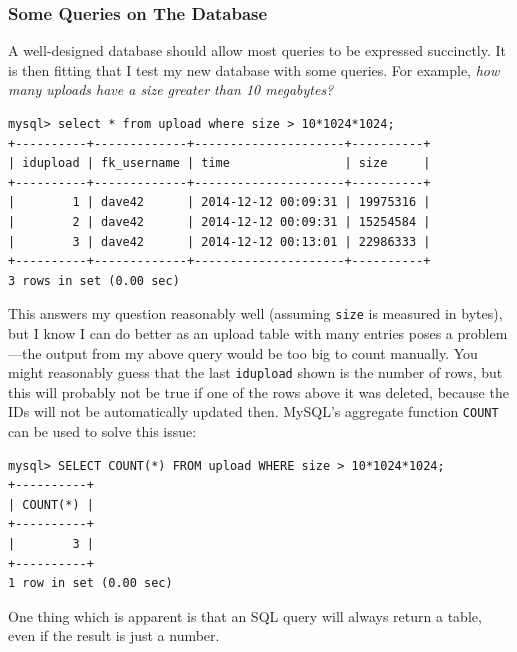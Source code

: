\documentclass[11pt,a4paper]{report}
\begin{document}
	\subsubsection{Some Queries on The Database}
	A well-designed database should allow most queries to be expressed succinctly. It is then fitting that I test my new database with some queries. For example, \textit{how many uploads have a size greater than 10 megabytes?}
	\begin{lstlisting}[style=highlightable, frame=none, numbers=none, xleftmargin=0ex, xrightmargin=0ex]
mysql> select * from upload where size > 10*1024*1024;
+----------+-------------+---------------------+----------+
| idupload | fk_username | time                | size     |
+----------+-------------+---------------------+----------+
|        1 | dave42      | 2014-12-12 00:09:31 | 19975316 |
|        2 | dave42      | 2014-12-12 00:09:31 | 15254584 |
|        3 | dave42      | 2014-12-12 00:13:01 | 22986333 |
+----------+-------------+---------------------+----------+
3 rows in set (0.00 sec)
	\end{lstlisting}
	This answers my question reasonably well (assuming \verb|size| is measured in bytes), but I know I can do better as an {\sc upload} table with many entries poses a problem---the output from my above query would be too big to count manually. You might reasonably guess that the last \verb|idupload| shown is the number of rows, but this will probably not be true if one of the rows above it was deleted, because the IDs will not be automatically updated then. MySQL's aggregate function \verb|COUNT| can be used to solve this issue:
	\begin{lstlisting}[style=highlightable, frame=none, numbers=none, xleftmargin=0ex, xrightmargin=0ex]
mysql> SELECT COUNT(*) FROM upload WHERE size > 10*1024*1024;
+----------+
| COUNT(*) |
+----------+
|        3 |
+----------+
1 row in set (0.00 sec)
	\end{lstlisting}
	One thing which is apparent is that an SQL query will always return a table, even if the result is just a number.
	
\end{document}
